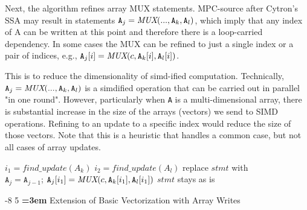 \documentclass[sigconf, screen, natbib=false, dvipsnames, table]{acmart}
\makeatletter
\renewcommand{\subsection}{\@startsection{subsection}{2}{\z@}%
                        {-8\p@ \@plus -4\p@ \@minus -4\p@}%
                        {5\p@ \@plus 2\p@ \@minus 2\p@}%
                        {\normalfont\Large\bfseries\boldmath
                         \rightskip=\z@ \@plus 3em\pretolerance=10000 }}
\theoremstyle{definition}
\makeatother
\begin{document}

Next, the algorithm refines array MUX statements.
MPC-source after Cytron's SSA may result in statements $\texttt{A}_j = \emph{MUX}(..., \texttt{A}_k, \texttt{A}_l)$, which imply that any index
of A can be written at this point and therefore there is a loop-carried dependency. In some cases the MUX can be refined to just a single
index or a pair of indices, e.g., $\texttt{A}_j[i] = \emph{MUX}(c, \texttt{A}_k[i], \texttt{A}_l[i])$.

This is to reduce the dimensionality of simd-ified computation. Technically, $\texttt{A}_j = \emph{MUX}(..., \texttt{A}_k, \texttt{A}_l)$ is
a simdified operation that can be carried out in parallel "in one round". However, particularly when \texttt{A} is a multi-dimensional array, there is
substantial increase in the size of the arrays (vectors) we send to SIMD operations. Refining to an update to a specific index would reduce
the size of those vectors. Note that this is a heuristic that handles a common case, but not all cases of array updates.


\begin{algorithmic}
\STATE $i_1 = \mathit{find\_update}(A_k)$ 
\STATE $i_2 = \mathit{find\_update}(A_l)$ 
 \STATE {}
\STATE replace $\mathit{stmt}$ with \\
\STATE $\texttt{A}_j = \texttt{A}_{j-1}$; $\texttt{A}_j[i_1] = \emph{MUX}(c, \texttt{A}_k[i_1], \texttt{A}_l[i_1])$
\ELSE
\STATE $\mathit{stmt}$ stays as is
\ENDIF
\ENDFOR
\end{algorithmic}

\subsection{Extension of Basic Vectorization with Array Writes}
\end{document}
